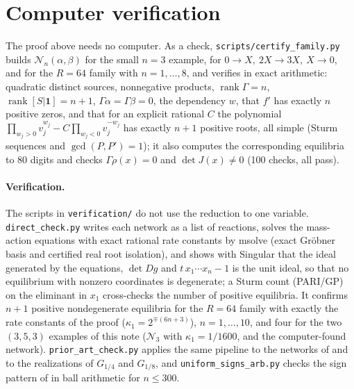 \documentclass[11pt,a4paper]{report}
\newcommand{\Net}{\mathcal N}
\begin{document}
\section{Computer verification}

The proof above needs no computer. As a check, \texttt{scripts/certify\_family.py} builds \(\Net_n(\alpha,\beta)\) for the
small \(n=3\) example, for \(0\to X,\ 2X\to3X,\ X\to0\), and for the \(R=64\) family with \(n=1,\dots,8\), and verifies in exact
arithmetic: quadratic distinct sources, nonnegative products, \(\operatorname{rank}\Gamma=n\),
\(\operatorname{rank}[S|\mathbf1]=n+1\), \(\Gamma\alpha=\Gamma\beta=0\), the dependency \(w\), that \(f'\) has exactly \(n\) positive
zeros, and that for an explicit rational \(C\) the polynomial
\(\prod_{w_j>0}v_j^{w_j}-C\prod_{w_j<0}v_j^{-w_j}\) has exactly \(n+1\) positive roots, all simple (Sturm sequences and
\(\gcd(P,P')=1\)); it also computes the corresponding equilibria to 80 digits and checks \(\Gamma\rho(x)=0\) and
\(\det J(x)\neq0\) (100 checks, all pass).

\paragraph{Verification.} The scripts in \texttt{verification/} do not use the reduction to one variable.
\texttt{direct\_check.py} writes each network as a list of reactions, solves the mass-action equations with exact
rational rate constants by msolve (exact Gr\"obner basis and certified real root isolation), and shows with Singular
that the ideal generated by the equations, \(\det Dg\) and \(t\,x_1\cdots x_n-1\) is the unit ideal, so that no equilibrium
with nonzero coordinates is degenerate; a Sturm count (PARI/GP) on the eliminant in \(x_1\) cross-checks the number of
positive equilibria. It confirms \(n+1\) positive nondegenerate equilibria for the \(R=64\) family with exactly the rate
constants of the proof (\(\kappa_1=2^{\mp(6n+3)}\)), \(n=1,\dots,10\), and four for the two \((3,5,3)\) examples of this note
(\(\Net_3\) with \(\kappa_1=1/1600\), and the computer-found network). \texttt{prior\_art\_check.py} applies the same
pipeline to the networks of \autocite{Anon2026} and to the realizations of \(G_{1/4}\) and \(G_{1/8}\), and
\texttt{uniform\_signs\_arb.py} checks the sign pattern of  in ball arithmetic for \(n\le300\).

\paperreferences
\end{document}
